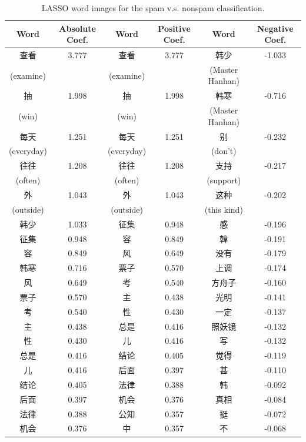 \documentclass[11pt]{article}
\newcommand{\1}[1]{{\mathbf 1}\left\{#1\right\}}        %
\begin{document}
\begin{table}[!h]
\caption{LASSO word images for the spam v.s. nonspam classification.}
\begin{center}
\begin{tabular}{|c|c||c|c||c|c|}
\hline
Word & Absolute Coef. & Word & Positive Coef. & Word & Negative Coef.\\ \hline
查看 & 3.777 & 查看 & 3.777 & 韩少 & -1.033\\
(examine) & & (examine) & & (Master Hanhan) & \\\hline
抽 & 1.998 & 抽 & 1.998 & 韩寒 & -0.716\\
(win) & & (win) & & (Master Hanhan) & \\\hline
每天 & 1.251 & 每天 & 1.251 & 别 & -0.232\\
(everyday) & & (everyday) & & (don't) & \\\hline
往往 & 1.208 & 往往 & 1.208 & 支持 & -0.217\\
(often) & & (often) & & (support) & \\\hline
外 & 1.043 & 外 & 1.043 & 这种 & -0.202\\
(outside) & & (outside) & & (this kind) & \\\hline
韩少 & 1.033 & 征集 & 0.948 & 感 & -0.196\\ \hline
征集 & 0.948 & 容 & 0.849 & 韓 & -0.191\\ \hline
容 & 0.849 & 风 & 0.649 & 没有 & -0.179\\ \hline
韩寒 & 0.716 & 票子 & 0.570 & 上调 & -0.174\\ \hline
风 & 0.649 & 考 & 0.540 & 方舟子 & -0.160\\ \hline
票子 & 0.570 & 主 & 0.438 & 光明 & -0.141\\ \hline
考 & 0.540 & 性 & 0.430 & 一定 & -0.137\\ \hline
主 & 0.438 & 总是 & 0.416 & 照妖镜 & -0.132\\ \hline
性 & 0.430 & 儿 & 0.416 & 写 & -0.132\\ \hline
总是 & 0.416 & 结论 & 0.405 & 觉得 & -0.119\\ \hline
儿 & 0.416 & 后面 & 0.397 & 甚 & -0.110\\ \hline
结论 & 0.405 & 法律 & 0.388 & 韩 & -0.092\\ \hline
后面 & 0.397 & 机会 & 0.376 & 真相 & -0.084\\ \hline
法律 & 0.388 & 公知 & 0.357 & 挺 & -0.072\\ \hline
机会 & 0.376 & 中 & 0.357 & 不 & -0.068\\ \hline
\end{tabular}
\label{tb:lassofullspam}
\end{center}
\end{table}
\end{document}
